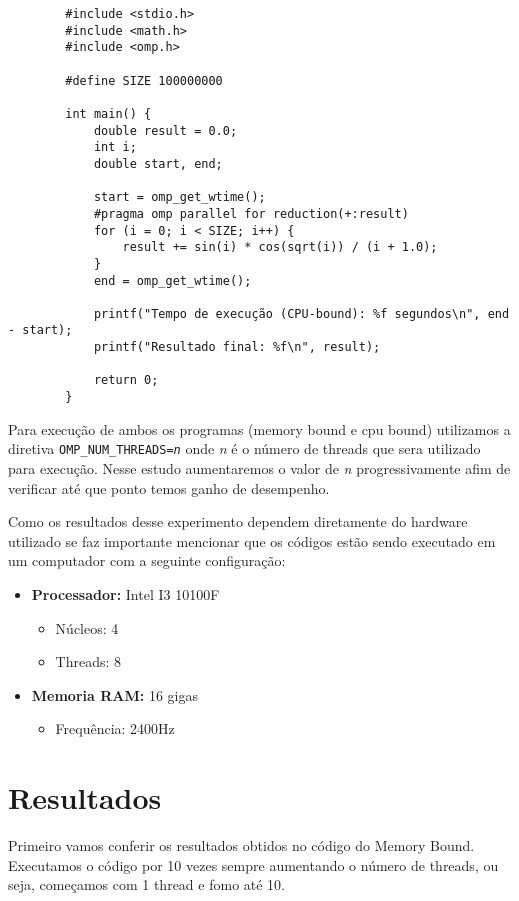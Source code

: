 \documentclass[a4paper, 12pt]{article}
\begin{document}
	\begin{verbatim}
		#include <stdio.h>
		#include <math.h>
		#include <omp.h>
		
		#define SIZE 100000000
		
		int main() {
			double result = 0.0;
			int i;
			double start, end;
			
			start = omp_get_wtime();
			#pragma omp parallel for reduction(+:result)
			for (i = 0; i < SIZE; i++) {
				result += sin(i) * cos(sqrt(i)) / (i + 1.0);
			}
			end = omp_get_wtime();
			
			printf("Tempo de execução (CPU-bound): %f segundos\n", end - start);
			printf("Resultado final: %f\n", result);
			
			return 0;
		}
	\end{verbatim}
	
		Para execução de ambos os programas (memory bound e cpu bound) utilizamos a diretiva \texttt{OMP\_NUM\_THREADS=\textit{n}} onde \textit{n} é o número de threads que sera utilizado para execução. Nesse estudo aumentaremos o valor de \textit{n} progressivamente afim de verificar até que ponto temos ganho de desempenho.
		
		Como os resultados desse experimento dependem diretamente do hardware utilizado se faz importante mencionar que os códigos estão sendo executado em um computador com a seguinte configuração:
		
		\begin{itemize}
			\item \textbf{Processador:} Intel I3 10100F 
				\begin{itemize}
					\item Núcleos: 4
					\item Threads: 8
				\end{itemize}
			\item \textbf{Memoria RAM:} 16 gigas
				\begin{itemize}
					\item Frequência: 2400Hz
				\end{itemize}	
		\end{itemize}
		
	\section{Resultados}
	
	Primeiro vamos conferir os resultados obtidos no código do Memory Bound. Executamos o código por 10 vezes sempre aumentando o número de threads, ou seja, começamos com 1 thread e fomo até 10.
	
\end{document}
